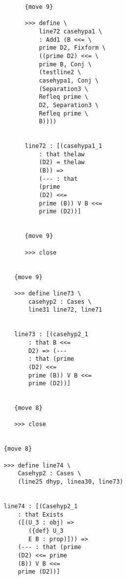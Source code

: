 \documentclass[12pt]{article}
\begin{document}
\begin{verbatim}
                              {move 9}

                              >>> define \
                                  line72 casehypa1 \
                                  : Add1 (B <<= \
                                  prime D2, Fixform \
                                  ((prime D2) <<= \
                                  prime B, Conj \
                                  (testline2 \
                                  casehypa1, Conj \
                                  (Separation3 \
                                  Refleq prime \
                                  D2, Separation3 \
                                  Refleq prime \
                                  B))))


                              line72 : [(casehypa1_1 
                                  : that thelaw 
                                  (D2) = thelaw 
                                  (B)) => 
                                  (--- : that 
                                  (prime 
                                  (D2) <<= 
                                  prime (B)) V B <<= 
                                  prime (D2))]


                              {move 9}

                              >>> close


                           {move 9}

                           >>> define line73 \
                               casehyp2 : Cases \
                               line31 line72, line71


                           line73 : [(casehyp2_1 
                               : that B <<= 
                               D2) => (--- 
                               : that (prime 
                               (D2) <<= 
                               prime (B)) V B <<= 
                               prime (D2))]


                           {move 8}

                           >>> close


                        {move 8}

                        >>> define line74 \
                            Casehyp2 : Cases \
                            (line25 dhyp, linea30, line73)


                        line74 : [(Casehyp2_1 
                            : that Exists 
                            ([(U_3 : obj) => 
                               ({def} U_3 
                               E B : prop)])) => 
                            (--- : that (prime 
                            (D2) <<= prime 
                            (B)) V B <<= 
                            prime (D2))]



\end{verbatim}
\end{document}
